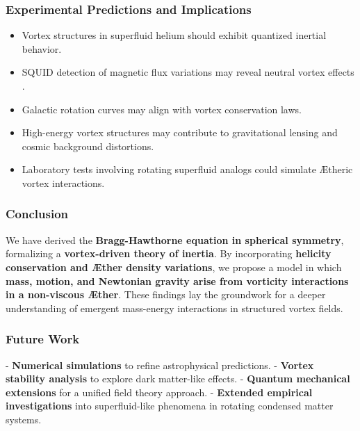 \subsubsection*{Experimental Predictions and Implications}
\begin{itemize}
    \item Vortex structures in superfluid helium should exhibit quantized inertial behavior.
    \item SQUID detection of magnetic flux variations may reveal neutral vortex effects \cite{donnelly1991quantized}.
    \item Galactic rotation curves may align with vortex conservation laws.
    \item High-energy vortex structures may contribute to gravitational lensing and cosmic background distortions.
    \item Laboratory tests involving rotating superfluid analogs could simulate \AE theric vortex interactions.
\end{itemize}

\subsubsection*{Conclusion}
We have derived the \textbf{Bragg-Hawthorne equation in spherical symmetry}, formalizing a \textbf{vortex-driven theory of inertia}. By incorporating \textbf{helicity conservation and \AE ther density variations}, we propose a model in which \textbf{mass, motion, and Newtonian gravity arise from vorticity interactions in a non-viscous \AE ther}. These findings lay the groundwork for a deeper understanding of emergent mass-energy interactions in structured vortex fields.

\subsubsection*{Future Work}
- \textbf{Numerical simulations} to refine astrophysical predictions.
- \textbf{Vortex stability analysis} to explore dark matter-like effects.
- \textbf{Quantum mechanical extensions} for a unified field theory approach.
- \textbf{Extended empirical investigations} into superfluid-like phenomena in rotating condensed matter systems.